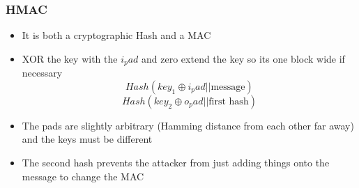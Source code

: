 \documentclass{article}
\begin{document}
\subsubsection{HMAC}
\begin{itemize}
\item It is both a cryptographic Hash and a MAC
\item XOR the key with the $i_pad$ and zero extend the key so its one block wide if necessary
$$Hash(key_1 \oplus i_pad || \textrm{message})$$
$$Hash(key_2 \oplus o_pad || \textrm{first hash})$$
\item The pads are slightly arbitrary (Hamming distance from each other far away) and the keys must be different
\item The second hash prevents the attacker from just adding things onto the message to change the MAC
\end{itemize}
\end{document}
